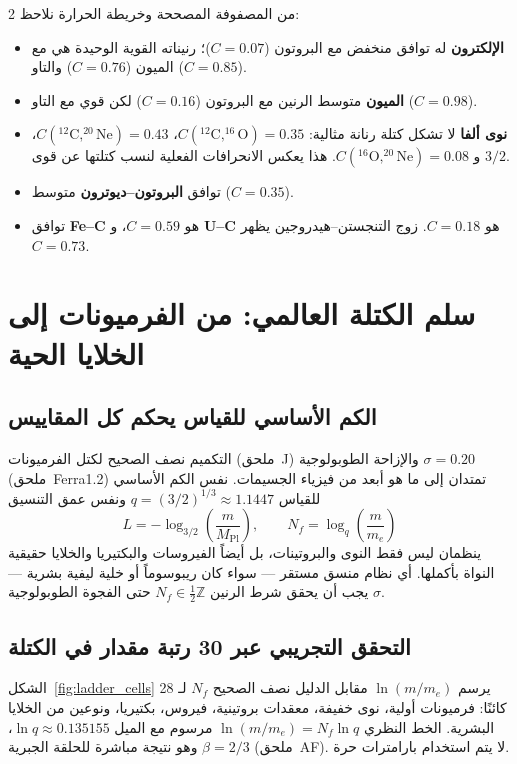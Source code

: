 \documentclass[11pt,a4paper]{article}
\begin{document}
	\begin{multicols}{2}
		من المصفوفة المصححة وخريطة الحرارة نلاحظ:
		\begin{itemize}
			\item \textbf{الإلكترون} له توافق منخفض مع البروتون (\(C=0.07\))؛ رنيناته القوية الوحيدة هي مع الميون (\(C=0.76\)) والتاو (\(C=0.85\)).
			\item \textbf{الميون} متوسط الرنين مع البروتون (\(C=0.16\)) لكن قوي مع التاو (\(C=0.98\)).
			\item \textbf{نوى ألفا} لا تشكل كتلة رنانة مثالية: \(C(^{12}\text{C},^{16}\text{O})=0.35\)، \(C(^{12}\text{C},^{20}\text{Ne})=0.43\)، و \(C(^{16}\text{O},^{20}\text{Ne})=0.08\). هذا يعكس الانحرافات الفعلية لنسب كتلتها عن قوى \(3/2\).
			\item توافق \textbf{البروتون–ديوترون} متوسط (\(C=0.35\)).
			\item توافق \textbf{Fe–C} هو \(C=0.59\)، و \textbf{U–C} هو \(C=0.18\). زوج التنجستن–هيدروجين يظهر \(C=0.73\).
		\end{itemize}
	\end{multicols}
	
	\section{سلم الكتلة العالمي: من الفرميونات إلى الخلايا الحية}
	\label{sec:ladder_cells}
	
	\subsection{الكم الأساسي للقياس يحكم كل المقاييس}
	
	التكميم نصف الصحيح لكتل الفرميونات (ملحق~J) والإزاحة الطوبولوجية \(\sigma = 0.20\) (ملحق~Ferra1.2) تمتدان إلى ما هو أبعد من فيزياء الجسيمات. نفس الكم الأساسي للقياس \(q = (3/2)^{1/3} \approx 1.1447\) ونفس عمق التنسيق
	\[
	L = -\log_{3/2}\left(\frac{m}{M_{\mathrm{Pl}}}\right), \qquad
	N_f = \log_q\left(\frac{m}{m_e}\right)
	\]
	ينظمان ليس فقط النوى والبروتينات، بل أيضاً الفيروسات والبكتيريا والخلايا حقيقية النواة بأكملها. أي نظام منسق مستقر — سواء كان ريبوسوماً أو خلية ليفية بشرية — يجب أن يحقق شرط الرنين \(N_f \in \frac{1}{2}\mathbb{Z}\) حتى الفجوة الطوبولوجية \(\sigma\).
	
	\subsection{التحقق التجريبي عبر 30 رتبة مقدار في الكتلة}
	
	الشكل~\ref{fig:ladder_cells} يرسم \(\ln(m/m_e)\) مقابل الدليل نصف الصحيح \(N_f\) لـ 28 كائنًا: فرميونات أولية، نوى خفيفة، معقدات بروتينية، فيروس، بكتيريا، ونوعين من الخلايا البشرية. الخط النظري \(\ln(m/m_e) = N_f \ln q\) مرسوم مع الميل \(\ln q \approx 0.135155\)، وهو نتيجة مباشرة للحلقة الجبرية \(\beta = 2/3\) (ملحق~AF). لا يتم استخدام بارامترات حرة.
	
\end{document}
